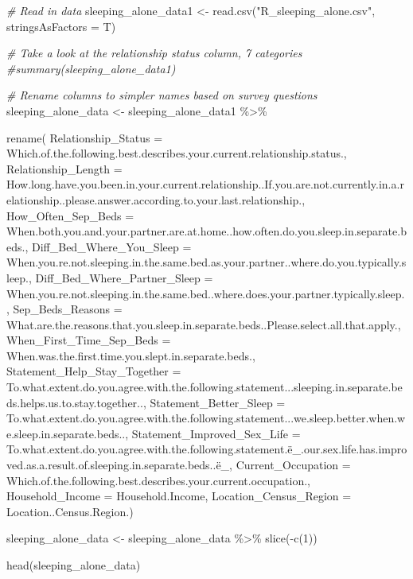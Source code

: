 \documentclass[
]{article}
\newenvironment{Shaded}{\begin{snugshade}}{\end{snugshade}}
\newcommand{\AttributeTok}[1]{\textcolor[rgb]{0.77,0.63,0.00}{#1}}
\newcommand{\CommentTok}[1]{\textcolor[rgb]{0.56,0.35,0.01}{\textit{#1}}}
\newcommand{\DecValTok}[1]{\textcolor[rgb]{0.00,0.00,0.81}{#1}}
\newcommand{\FunctionTok}[1]{\textcolor[rgb]{0.00,0.00,0.00}{#1}}
\newcommand{\NormalTok}[1]{#1}
\newcommand{\OtherTok}[1]{\textcolor[rgb]{0.56,0.35,0.01}{#1}}
\newcommand{\SpecialCharTok}[1]{\textcolor[rgb]{0.00,0.00,0.00}{#1}}
\newcommand{\StringTok}[1]{\textcolor[rgb]{0.31,0.60,0.02}{#1}}
\begin{document}
\begin{Shaded}
\begin{Highlighting}[]
\CommentTok{\# Read in data}
\NormalTok{sleeping\_alone\_data1 }\OtherTok{\textless{}{-}} \FunctionTok{read.csv}\NormalTok{(}\StringTok{"R\_sleeping\_alone.csv"}\NormalTok{, }\AttributeTok{stringsAsFactors =}\NormalTok{ T)}

\CommentTok{\# Take a look at the relationship status column, 7 categories}
\CommentTok{\#summary(sleeping\_alone\_data1)}

\CommentTok{\# Rename columns to simpler names based on survey questions}
\NormalTok{sleeping\_alone\_data }\OtherTok{\textless{}{-}}\NormalTok{ sleeping\_alone\_data1 }\SpecialCharTok{\%\textgreater{}\%}
  
  \FunctionTok{rename}\NormalTok{( }\AttributeTok{Relationship\_Status =}\NormalTok{ Which.of.the.following.best.describes.your.current.relationship.status., }
         \AttributeTok{Relationship\_Length =}\NormalTok{ How.long.have.you.been.in.your.current.relationship..If.you.are.not.currently.in.a.relationship..please.answer.according.to.your.last.relationship.,}
         \AttributeTok{How\_Often\_Sep\_Beds =}\NormalTok{ When.both.you.and.your.partner.are.at.home..how.often.do.you.sleep.in.separate.beds., }
         \AttributeTok{Diff\_Bed\_Where\_You\_Sleep =}\NormalTok{ When.you.re.not.sleeping.in.the.same.bed.as.your.partner..where.do.you.typically.sleep., }
         \AttributeTok{Diff\_Bed\_Where\_Partner\_Sleep =}\NormalTok{ When.you.re.not.sleeping.in.the.same.bed..where.does.your.partner.typically.sleep., }
         \AttributeTok{Sep\_Beds\_Reasons =}\NormalTok{ What.are.the.reasons.that.you.sleep.in.separate.beds..Please.select.all.that.apply., }
         \AttributeTok{When\_First\_Time\_Sep\_Beds =}\NormalTok{ When.was.the.first.time.you.slept.in.separate.beds., }
         \AttributeTok{Statement\_Help\_Stay\_Together =}\NormalTok{  To.what.extent.do.you.agree.with.the.following.statement...sleeping.in.separate.beds.helps.us.to.stay.together.., }
         \AttributeTok{Statement\_Better\_Sleep =}\NormalTok{  To.what.extent.do.you.agree.with.the.following.statement...we.sleep.better.when.we.sleep.in.separate.beds..,}
         \AttributeTok{Statement\_Improved\_Sex\_Life =}\NormalTok{ To.what.extent.do.you.agree.with.the.following.statement.ë\_.our.sex.life.has.improved.as.a.result.of.sleeping.in.separate.beds..ë\_, }
         \AttributeTok{Current\_Occupation =}\NormalTok{  Which.of.the.following.best.describes.your.current.occupation.,}
         \AttributeTok{Household\_Income =}\NormalTok{ Household.Income,  }
         \AttributeTok{Location\_Census\_Region =}\NormalTok{ Location..Census.Region.)}
  

\NormalTok{sleeping\_alone\_data }\OtherTok{\textless{}{-}}\NormalTok{ sleeping\_alone\_data }\SpecialCharTok{\%\textgreater{}\%} \FunctionTok{slice}\NormalTok{(}\SpecialCharTok{{-}}\FunctionTok{c}\NormalTok{(}\DecValTok{1}\NormalTok{))}

\FunctionTok{head}\NormalTok{(sleeping\_alone\_data)}
\end{Highlighting}
\end{Shaded}
\end{document}
